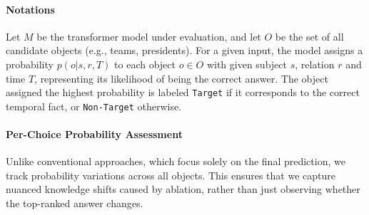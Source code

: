 \paragraph{Notations}
Let \( M \) be the transformer model under evaluation, and let \( O \) be the set of all candidate objects (e.g., teams, presidents).  
For a given input, the model assigns a probability \( p(o | s,r,T) \) to each object \( o \in O \) with given subject $s$, relation $r$ and time $T$, representing its likelihood of being the correct answer.  
The object assigned the highest probability is labeled \texttt{Target} if it corresponds to the correct temporal fact, or \texttt{Non-Target} otherwise.
\paragraph{Per-Choice Probability Assessment}
Unlike conventional approaches, which focus solely on the final prediction, we track probability variations across all objects.  
This ensures that we capture nuanced knowledge shifts caused by ablation, rather than just observing whether the top-ranked answer changes.

